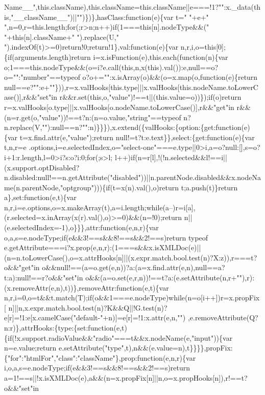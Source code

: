 \begin{DoxyCode}
{      Name\_\_",this.className),this.className=this.className||e===!1?"":x.\_data(this,"\_\_className\_\_")||"")\})\},hasClass:function(e)\{var t=" "+e+" ",n=0,r=this.length;for(;r>n;n++)if(1===this[n].nodeType&&("
       "+this[n].className+" ").replace(U," ").indexOf(t)>=0)return!0;return!1\},val:function(e)\{var
       n,r,i,o=this[0];\{if(arguments.length)return i=x.isFunction(e),this.each(function(n)\{var
       o;1===this.nodeType&&(o=i?e.call(this,n,x(this).val()):e,null==o?o="":"number"==typeof o?o+="":x.isArray(o)&&(o=x.map(o,function(e)\{return
       null==e?"":e+""\})),r=x.valHooks[this.type]||x.valHooks[this.nodeName.toLowerCase()],r&&"set"in
       r&&r.set(this,o,"value")!==t||(this.value=o))\});if(o)return r=x.valHooks[o.type]||x.valHooks[o.nodeName.toLowerCase()],r&&"get"in
       r&&(n=r.get(o,"value"))!==t?n:(n=o.value,"string"==typeof
       n?n.replace(V,""):null==n?"":n)\}\}\}),x.extend(\{valHooks:\{option:\{get:function(e)\{var t=x.find.attr(e,"value");return null!=t?t:e.text\}\},select:\{get:function(e)\{var
       t,n,r=e
      .options,i=e.selectedIndex,o="select-one"===e.type||0>i,a=o?null:[],s=o?i+1:r.length,l=0>i?s:o?i:0;for(;s>l;
      l++)if(n=r[l],!(!n.selected&&l!==i||(x.support.optDisabled?n.disabled:null!==n.getAttribute("disabled"))||n.parentNode.disabled&&x.nodeName(n.parentNode,"optgroup")))\{if(t=x(n).val(),o)return t;a.push(t)\}return
       a\},set:function(e,t)\{var
       n,r,i=e.options,o=x.makeArray(t),a=i.length;while(a--)r=i[a],(r.selected=x.inArray(x(r).val(),o)>=0)&&(n=!0);return n||(e.selectedIndex=-1),o\}\}\},attr:function(e,n,r)\{var
       o,a,s=e.nodeType;if(e&&3!==s&&8!==s&&2!==s)return typeof
       e.getAttribute===i?x.prop(e,n,r):(1===s&&x.isXMLDoc(e)||(n=n.toLowerCase(),o=x.attrHooks[n]||(x.expr.match.bool.test(n)?X:z)),r===t?o&&"get"in
       o&&null!==(a=o.get(e,n))?a:(a=x.find.attr(e,n),null==a?t:a):null!==r?o&&"set"in
       o&&(a=o.set(e,r,n))!==t?a:(e.setAttribute(n,r+""),r):(x.removeAttr(e,n),t))\},removeAttr:function(e,t)\{var
       n,r,i=0,o=t&&t.match(T);if(o&&1===e.nodeType)while(n=o[i++])r=x.propFix[
      n]||n,x.expr.match.bool.test(n)?K&&Q||!G.test(n)?e[r]=!1:e[x.camelCase("default-"+n)]=e[r]=!1:x.attr(e,n,"")
      ,e.removeAttribute(Q?n:r)\},attrHooks:\{type:\{set:function(e,t)\{if(!x.support.radioValue&&"radio"===t&&x.nodeName(e,"input"))\{var n=e.value;return
       e.setAttribute("type",t),n&&(e.value=n),t\}\}\}\},propFix:\{"for":"htmlFor","class":"className"\},prop:function(e,n,r)\{var i,o,a,s=e.nodeType;if(e&&3!==s&&8!==s&&2!==s)return
       a=1!==s||!x.isXMLDoc(e),a&&(n=x.propFix[n]||n,o=x.propHooks[n]),r!==t?o&&"set"in
}
\end{DoxyCode}
